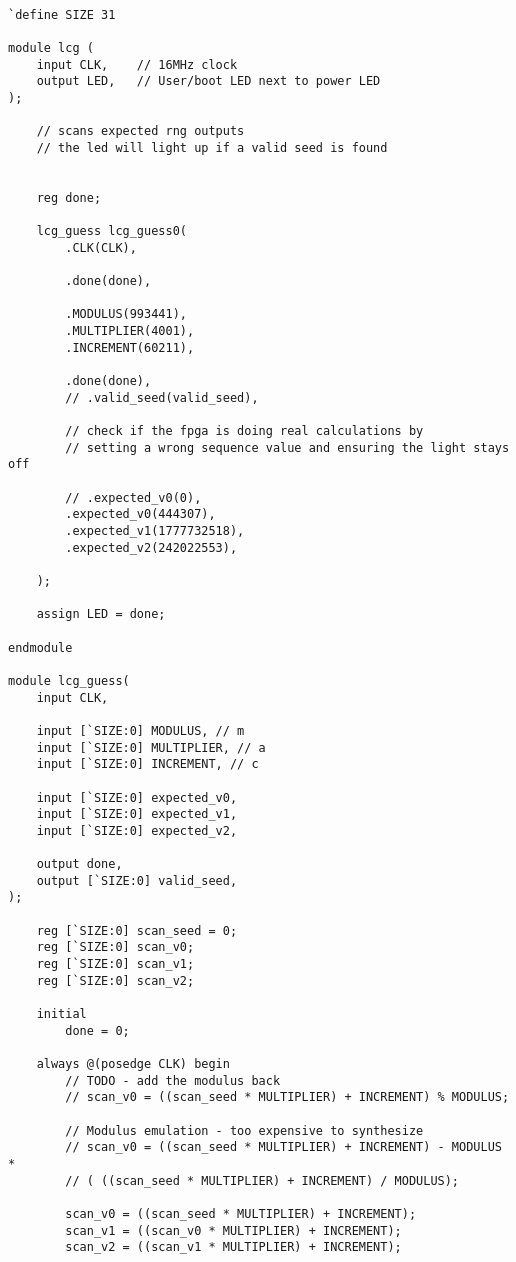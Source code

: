 \documentclass{article}
\begin{document}
    \begin{lstlisting}
        
`define SIZE 31

module lcg (
    input CLK,    // 16MHz clock
    output LED,   // User/boot LED next to power LED
);

    // scans expected rng outputs
    // the led will light up if a valid seed is found
    
    
    reg done;

    lcg_guess lcg_guess0(
        .CLK(CLK),
        
        .done(done),
                
        .MODULUS(993441),
        .MULTIPLIER(4001),
        .INCREMENT(60211),
        
        .done(done),
        // .valid_seed(valid_seed),
        
        // check if the fpga is doing real calculations by 
        // setting a wrong sequence value and ensuring the light stays off
        
        // .expected_v0(0),
        .expected_v0(444307),
        .expected_v1(1777732518),
        .expected_v2(242022553),
        
    );
    
    assign LED = done;

endmodule

module lcg_guess(
    input CLK,
    
    input [`SIZE:0] MODULUS, // m
    input [`SIZE:0] MULTIPLIER, // a
    input [`SIZE:0] INCREMENT, // c
    
    input [`SIZE:0] expected_v0,
    input [`SIZE:0] expected_v1,
    input [`SIZE:0] expected_v2,
    
    output done,
    output [`SIZE:0] valid_seed,
);

    reg [`SIZE:0] scan_seed = 0;
    reg [`SIZE:0] scan_v0;
    reg [`SIZE:0] scan_v1;
    reg [`SIZE:0] scan_v2;
    
    initial 
        done = 0;
    
    always @(posedge CLK) begin
        // TODO - add the modulus back
        // scan_v0 = ((scan_seed * MULTIPLIER) + INCREMENT) % MODULUS;
        
        // Modulus emulation - too expensive to synthesize
        // scan_v0 = ((scan_seed * MULTIPLIER) + INCREMENT) - MODULUS *
        // ( ((scan_seed * MULTIPLIER) + INCREMENT) / MODULUS);
        
        scan_v0 = ((scan_seed * MULTIPLIER) + INCREMENT);
        scan_v1 = ((scan_v0 * MULTIPLIER) + INCREMENT);
        scan_v2 = ((scan_v1 * MULTIPLIER) + INCREMENT);
        

\end{lstlisting}
\end{document}

